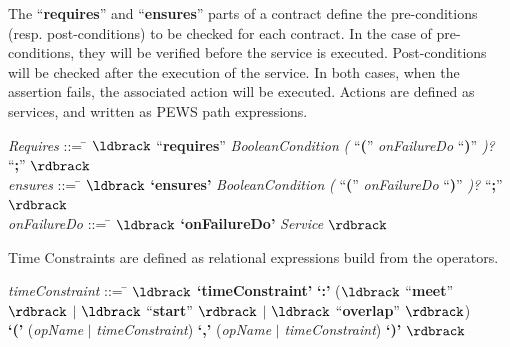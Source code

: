 The ``\textbf{requires}'' and ``\textbf{ensures}'' parts of a contract define the pre-conditions (resp. post-conditions) to be checked for each contract. 
In the case of pre-conditions, they will be verified before the service is executed.
Post-conditions will be checked after the execution of the service.
In both cases, when the assertion fails, the associated action will be executed.
Actions are defined as services, and written as PEWS path expressions.
\begin{small} 
\begin{tabbing}
\reg \textit{Requires} ::= \= $\ldbrack$ ``\textbf{requires}''
  \textit{BooleanCondition} \textit{(} ``\textbf{(}'' \textit{onFailureDo} ``\textbf{)}''
  \textit{)?} ``\textbf{;}'' $\rdbrack$
  \\[1.5mm]
   
   \reg \textit{ensures} ::= \= $\ldbrack$ \textbf{`ensures'}
  \textit{BooleanCondition} \textit{(} ``\textbf{(}'' \textit{onFailureDo} ``\textbf{)}''
    \textit{)?} ``\textbf{;}'' $\rdbrack$
  \\[1.5mm]
  
   \reg \textit{onFailureDo} ::= \= $\ldbrack$ \textbf{`onFailureDo'}
  \textit{Service} $\rdbrack$ \\[-3mm]
\end{tabbing}
\end{small}

Time Constraints are defined as relational expressions build from the operators.
\begin{small} 
\begin{tabbing}
  \reg \textit{timeConstraint} ::= \= $\ldbrack$ \textbf{`timeConstraint'} \textbf{`:'} 
                                                   ($\ldbrack$  ``\textbf{meet}'' $\rdbrack$ $|$ $\ldbrack$  ``\textbf{start}'' $\rdbrack$ $|$
                                                    $\ldbrack$  ``\textbf{overlap}'' $\rdbrack$) \\ \>
  \textbf{`('} 
  (\textit{opName} $|$ \textit{timeConstraint}) 
  \textbf{`,'} (\textit{opName} $|$ \textit{timeConstraint}) \textbf{`)'} $\rdbrack$ 

\end{tabbing}
\end{small} 

